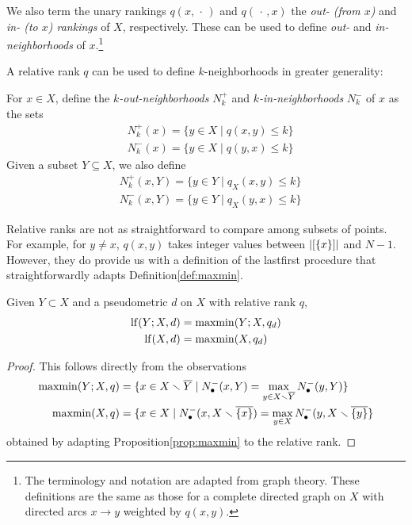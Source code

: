 \documentclass[
]{article}
\begin{document}
We also term the unary rankings \(q(x,\,\cdot\,)\) and
\(q(\,\cdot\,,x)\) the \emph{out- (from $x$)} and
\emph{in- (to $x$) rankings} of \(X\), respectively. These can be used
to define \emph{out-} and \emph{in-neighborhoods} of \(x\).\footnote{The
  terminology and notation are adapted from graph theory. These
  definitions are the same as those for a complete directed graph on
  \(X\) with directed arcs \(x\to y\) weighted by \(q(x,y)\).}

A relative rank \(q\) can be used to define \(k\)-neighborhoods in
greater generality:

\begin{definition}
    For $x \in X$, define the \emph{$k$-out-neighborhoods} $N^+_k$ and \emph{$k$-in-neighborhoods} $N^-_k$ of $x$ as the sets
    \begin{align*}
        & N^+_k(x)=\{y\in X\mid q(x,y)\leq k\} \\
        & N^-_k(x)=\{y\in X\mid q(y,x)\leq k\}
    \end{align*}
    Given a subset $Y \subseteq X$, we also define
    \begin{align*}
        & N^+_k(x,Y)=\{y\in Y\mid q_X(x,y)\leq k\} \\
        & N^-_k(x,Y)=\{y\in Y\mid q_X(y,x)\leq k\}
    \end{align*}
\end{definition}

Relative ranks are not as straightforward to compare among subsets of
points. For example, for \(y\neq x\), \(q(x,y)\) takes integer values
between \(\lvert [\{x\}]\rvert\) and \(N-1\). However, they do provide us
with a definition of the lastfirst procedure that straightforwardly
adapts Definition\nbs\ref{def:maxmin}.

\begin{lemma}
    Given $Y\subset X$ and a pseudometric $d$ on $X$ with relative rank $q$,
    \begin{align*}
        \operatorname{lf}(Y;X,d) &= \operatorname{maxmin}(Y;X,q_d) \\
        \operatorname{lf}(X,d) &= \operatorname{maxmin}(X,q_d)
    \end{align*}
\end{lemma}

\begin{proof}
This follows directly from the observations
\begin{align*}
    \operatorname{maxmin}(Y;X,q) &= \{x\in X\smallsetminus \overline{Y}\mid N_\bullet^-(x,Y) = \max_{y\in X\smallsetminus \overline{Y}}{N_\bullet^-(y,Y)}\} \\
    \operatorname{maxmin}(X,q) &= \{x\in X\mid N_\bullet^-(x,X \smallsetminus \overline{\{x\}}) = \max_{y\in X}{N_\bullet^-(y,X \smallsetminus \overline{\{y\}}}\}
\end{align*}
obtained by adapting Proposition\nbs\ref{prop:maxmin} to the relative rank.
\end{proof}
\end{document}
